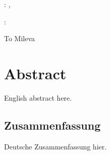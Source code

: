 \documentclass[%
    twoside, openright, titlepage, numbers=noenddot,%
    cleardoublepage=empty,%
    abstract=false,%
    BCOR=5.5mm, paper=a5, fontsize=10pt,%
]{mythesis}
\begin{document}
\hfill

\vfill

\noindent\myName: \textit{\myTitle,} %
\textcopyright\ \myTime

\bigskip

\noindent{}: \myDOI

%
%
%
%
%
\cleardoublepage%
\thispagestyle{empty}
{}

\vspace*{3cm}

\begin{center}
    To Mileva
\end{center}

\medskip
\cleardoublepage%
\begingroup
\let\clearpage\relax
\let\cleardoublepage\relax
\let\cleardoublepage\relax

\chapter*{Abstract}

English abstract here.

\endgroup

\cleardoublepage%

\begingroup
\let\clearpage\relax
\let\cleardoublepage\relax
\let\cleardoublepage\relax

\begin{otherlanguage}{ngerman}
\chapter*{Zusammenfassung}

Deutsche Zusammenfassung hier.

\end{otherlanguage}
\end{document}
